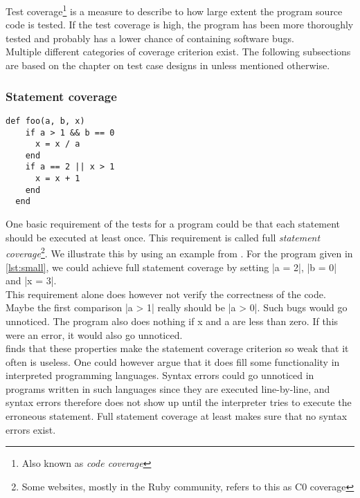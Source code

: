 \MakeShortVerb{\|}

\label{sec:theory_coverage} Test coverage\footnote{Also known as
\emph{code coverage}} is a measure to describe to how large extent the
program source code is tested. If the test coverage is high, the program
has been more thoroughly tested and probably has a lower chance of
containing software bugs. \cite{wiki:coverage}\\

Multiple different categories of coverage criterion exist. The
following subsections are based on the chapter on test case designs in
\citet{book:art_of_testing} unless mentioned otherwise.\\


\subsubsection{Statement coverage}
\label{sec:theory_statement_coverage}
\begin{lstlisting}[caption=A small example program for explaining different test coverage concepts.,
                   label=lst:small, float=t]
  def foo(a, b, x)
    if a > 1 && b == 0
      x = x / a
    end
    if a == 2 || x > 1
      x = x + 1
    end
  end
\end{lstlisting}

One basic requirement of the tests for a program could be that each
statement should be executed at least once. This requirement is called
full \emph{statement coverage}\footnote{Some websites, mostly in the
Ruby community, refers to this as C0 coverage}. We illustrate this by
using an example from \citet{book:art_of_testing}. For the program given
in \ref{lst:small}, we could achieve full statement coverage by setting
|a = 2|, |b = 0| and |x = 3|.\\

This requirement alone does however not verify the correctness of the
code. Maybe the first comparison |a > 1| really should be |a > 0|. Such
bugs would go unnoticed. The program also does nothing if x and a are
less than zero. If this were an error, it would also go unnoticed.\\

\citeauthor{book:art_of_testing} finds that these properties make the
statement coverage criterion so weak that it often is useless. One could
however argue that it does fill some functionality in interpreted
programming languages. Syntax errors could go unnoticed in programs
written in such languages since they are executed line-by-line, and
syntax errors therefore does not show up until the interpreter tries to
execute the erroneous statement. Full statement coverage at least makes
sure that no syntax errors exist.\\


